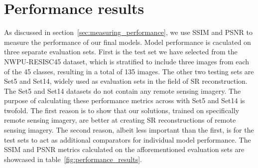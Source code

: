 \section{Performance results}
As discussed in section~\ref{sec:measuring_performance}, we use SSIM and PSNR to measure the performance of our final models. Model performance is caculated on three separate evaluation sets. First is the test set we have selected from the NWPU-RESISC45 dataset, which is stratified to include three images from each of the 45 classes, resulting in a total of 135 images. The other two testing sets are Set5 and Set14, widely used as evaluation sets in the field of SR reconstruction. The Set5 and Set14 datasets do not contain any remote sensing imagery. The purpose of calculating these performance metrics across with Set5 and Set14 is twofold. The first reason is to show that our solutions, trained on specifically remote sensing imagery, are better at creating SR reconstructions of remote sensing imagery. The second reason, albeit less important than the first, is for the test sets to act as additional comparators for individual model performance. The SSIM and PSNR metrics calculated on the afforementioned evaluation sets are showcased in table~\ref{fig:performance_results}.
